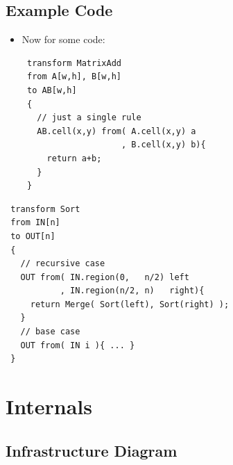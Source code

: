 \documentclass{beamer}
\begin{document}
\subsection{Example Code}

\begin{frame}[fragile]
\begin{itemize}
\item Now for some code:
{\small
\begin{verbatim}
 transform MatrixAdd
 from A[w,h], B[w,h] 
 to AB[w,h]
 {
   // just a single rule
   AB.cell(x,y) from( A.cell(x,y) a
                    , B.cell(x,y) b){
     return a+b;
   }
 }
\end{verbatim}
}
\end{itemize}
\end{frame}

\begin{frame}[fragile]
\begin{minipage}{\textwidth}
{\footnotesize
\begin{verbatim}
 transform Sort 
 from IN[n]
 to OUT[n]
 {
   // recursive case
   OUT from( IN.region(0,   n/2) left
           , IN.region(n/2, n)   right){
     return Merge( Sort(left), Sort(right) );
   }
   // base case
   OUT from( IN i ){ ... }
 }
\end{verbatim}
}
\end{minipage}
\end{frame}

\section{Internals}
\subsection{Infrastructure Diagram}

\end{document}
